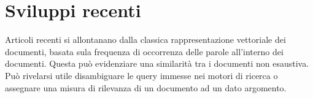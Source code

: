 \section{Sviluppi recenti}
Articoli recenti si allontanano dalla classica rappresentazione vettoriale dei documenti, basata sula frequenza di occorrenza delle parole all'interno dei documenti. Questa può evidenziare una similarità tra i documenti non esaustiva. Può rivelarsi utile disambiguare le query immesse nei motori di ricerca o assegnare una misura di rilevanza di un documento ad un dato argomento.

